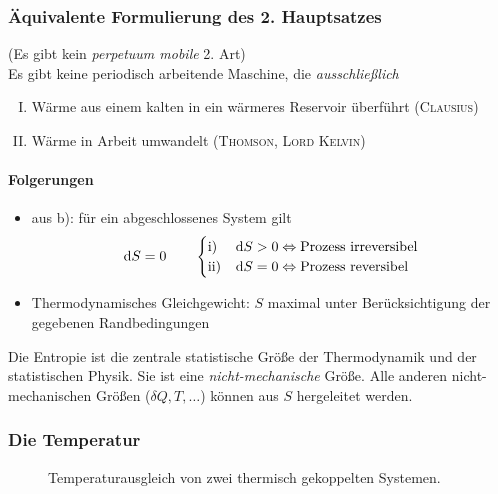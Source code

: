 \subsubsection{Äquivalente Formulierung des 2. Hauptsatzes}
(Es gibt kein \emph{perpetuum mobile} 2. Art) \\
Es gibt keine periodisch arbeitende Maschine, die \emph{ausschließlich}
\begin{enumerate}[I.]
    \item Wärme aus einem kalten in ein wärmeres Reservoir überführt (\textsc{Clausius})
    \item Wärme in Arbeit umwandelt (\textsc{Thomson}, \textsc{Lord Kelvin})
\end{enumerate}
\paragraph{Folgerungen}
\begin{itemize}
    \item aus b): für ein abgeschlossenes System gilt
    \begin{equation}
        \mathrm{d} S = 0 \qquad
        \begin{cases}
            \text{i) } & \mathrm{d} S > 0 \Leftrightarrow \text{Prozess irreversibel} \\
            \text{ii)} & \mathrm{d} S = 0 \Leftrightarrow \text{Prozess reversibel}
        \end{cases}
    \end{equation}
    \item Thermodynamisches Gleichgewicht: $S$ maximal unter Berücksichtigung der gegebenen Randbedingungen
\end{itemize}
Die Entropie ist die zentrale statistische Größe der Thermodynamik und der statistischen Physik. Sie ist eine \emph{nicht-mechanische} Größe.
Alle anderen nicht-mechanischen Größen ($\delta Q, T, \ldots$) können aus $S$ hergeleitet werden.
\subsubsection{Die Temperatur}

    \begin{figure}[H]
        \centering
        \def\svgwidth{0.85\textwidth}
        
        \caption{Temperaturausgleich von zwei thermisch gekoppelten Systemen.}
        \label{img:derivationT}
    \end{figure}

